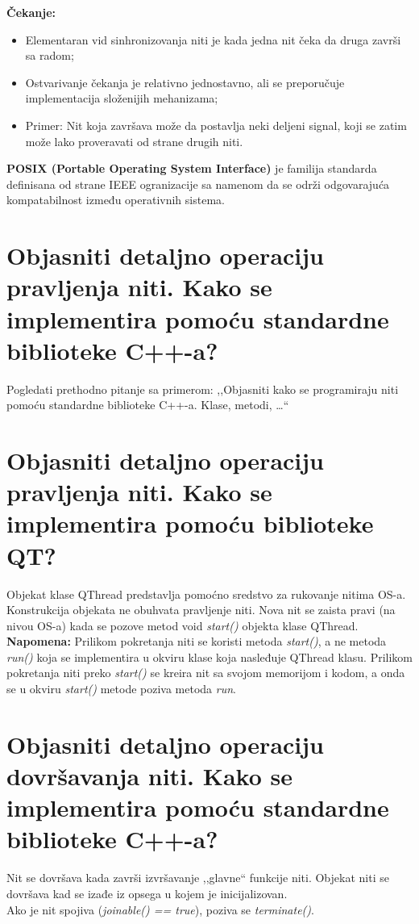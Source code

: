 \documentclass[a4paper]{article}
\begin{document}
  \textbf{Čekanje:}
    \begin{itemize}  
      \item Elementaran vid sinhronizovanja niti je kada jedna nit čeka da druga završi sa radom;
      \item Ostvarivanje čekanja je relativno jednostavno, ali se preporučuje implementacija 
            složenijih mehanizama;
      \item Primer: Nit koja završava može da postavlja neki deljeni signal, koji se zatim može 
            lako proveravati od strane drugih niti.
    \end{itemize}
    \textbf{POSIX (Portable Operating System Interface)} je familija standarda definisana od strane
    IEEE ogranizacije sa namenom da se održi odgovarajuća kompatabilnost između operativnih sistema.

\section{Objasniti detaljno operaciju pravljenja niti. Kako se implementira pomoću 
         standardne biblioteke C++-a?}
  Pogledati prethodno pitanje sa primerom: 
  ,,Objasniti kako se programiraju niti pomoću standardne biblioteke C++-a. Klase, metodi, \dots``

\section{Objasniti detaljno operaciju pravljenja niti. 
         Kako se implementira pomoću biblioteke QT?}
  Objekat klase QThread predstavlja pomoćno sredstvo za rukovanje nitima OS-a. 
  Konstrukcija objekata ne obuhvata pravljenje niti. Nova nit se zaista pravi (na nivou OS-a) 
  kada se pozove metod void \textit{start()} objekta klase QThread.\\

  \textbf{Napomena:} Prilikom pokretanja niti se koristi metoda \textit{start()}, a ne 
  metoda \textit{run()} koja se implementira u okviru klase koja nasleđuje QThread klasu.
  Prilikom pokretanja niti preko \textit{start()} se kreira nit sa svojom memorijom i kodom, a onda se 
  u okviru \textit{start()} metode poziva metoda \textit{run}.
  
\section{Objasniti detaljno operaciju dovršavanja niti. Kako se implementira pomoću standardne
         biblioteke C++-a?}
  Nit se dovršava kada završi izvršavanje ,,glavne`` funkcije niti. Objekat niti se dovršava kad se 
  izađe iz opsega u kojem je inicijalizovan. \\
  \indent Ako je nit spojiva (\textit{joinable() == true}), poziva se \textit{terminate()}.
  \cite{cppref_threaddestructor}
\end{document}
